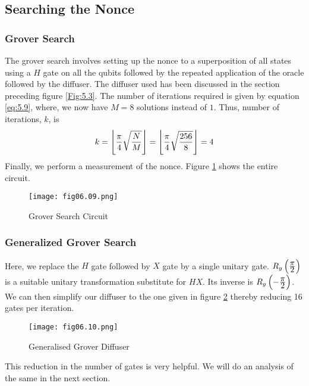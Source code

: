 \subsection{Searching the Nonce}

\subsubsection*{Grover Search}
The grover search involves setting up the nonce to a superposition of all states using a $H$ gate on all the qubits followed by the repeated application of the oracle followed by the diffuser. The diffuser used has been discussed in the section preceding figure \ref{Fig:5.3}. The number of iterations required is given by equation \ref{eq:5.9}, where, we now have $M=8$ solutions instead of $1$. Thus, number of iterations, $k$, is
\begin{equation}
\label{eq:6.1}
k=\left\lfloor\frac{\displaystyle \pi}{\displaystyle 4}\sqrt{\frac{\displaystyle N}{\displaystyle M}}\right\rfloor=\left\lfloor\frac{\displaystyle \pi}{\displaystyle 4}\sqrt{\frac{\displaystyle 256}{\displaystyle 8}}\right\rfloor=4
\end{equation}
Finally, we perform a measurement of the nonce. Figure \ref{Fig:6.9} shows the entire circuit.
\begin{figure}[!htb]
   \begin{minipage}{\textwidth}
     \centering
     \texttt{[image: fig06.09.png]}
     \caption{Grover Search Circuit}
     \label{Fig:6.9}
   \end{minipage}
\end{figure}

\subsubsection*{Generalized Grover Search}
Here, we replace the $H$ gate followed by $X$ gate by a single unitary gate. $R_y\left(\frac{\displaystyle \pi}{\displaystyle 2}\right)$ is a suitable unitary transformation substitute for $HX$. Its inverse is $R_y\left(-\frac{\displaystyle \pi}{\displaystyle 2}\right)$. We can then simplify our diffuser to the one given in figure \ref{Fig:6.10} thereby reducing 16 gates per iteration.
\begin{figure}[!htb]
   \begin{minipage}{\textwidth}
     \centering
     \texttt{[image: fig06.10.png]}
     \caption{Generalised Grover Diffuser}
     \label{Fig:6.10}
   \end{minipage}
\end{figure}
This reduction in the number of gates is very helpful. We will do an analysis of the same in the next section.

